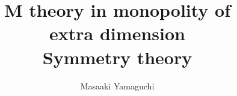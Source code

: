 \documentclass{jsarticle}
\begin{document}
\title{M theory in monopolity of \\
extra dimension\\
Symmetry theory}
\author{Masaaki Yamaguchi}
\date{}
\maketitle
   \newcommand{\variint}{%
	\begin{picture}(15,30)
		\put(0,0){
			$ \iint $}
		\put(0,5){\line(15,0){15}}
	\end{picture} %
}

\newcommand{\variiint}{%
	\begin{picture}(15,15)
		\put(0,0){
			$ \iiint $}
		\put(0,5){\line(15,0){20}}
	\end{picture} %
}



 \newcommand{\alearletter}{%
	 \begin{picture}(10,20)
		 \put(0,0){
			 $ \square $}
		 \put(0,0){\line(1,1){10}}
	 \end{picture} %
	 }

 \newcommand{\secproduct}{%
	 \begin{picture}(10,20)
		 \put(0,0){
			 $ \nabla $}
		 \put(5,0){+}
	 \end{picture} %
	 }
 \newcommand{\talot}{%
	 \begin{picture}(15,20)
		 \put(0,0){
			 $ \text{\scalebox{2.0}[2]{$\nabla$}}$}
		 \put(5,3){
			 $ \Delta $}
	 \end{picture} %
	 }
 \newcommand{\hazerdnabla}{%
	 \begin{picture}(15,20)
		 \put(0,0){
			 $ \text{\scalebox{2.0}[2]{$\nabla$}}$}
		 \put(5,3){
			 $\text{Y}  $}
	 \end{picture} %
	 }

 \newcommand{\securebox}{%
	 \begin{picture}(15,20)
		 \put(0,0){
			 $ \text{\scalebox{2.0}[2]{$\square$}}$}
		 \put(5,3){
			 $\text{Y}  $}
	 \end{picture} %
	 }


\newcommand{\timebow}{%
	\begin{picture}(5,5)
		\put(0,0){$\text{\rotatebox{90}{$\bowtie$}}$}
	\end{picture} %
	}


 \newcommand{\flowerletter}{%
	 \begin{picture}(10,20)
		 \put(0,0){$\text{\scalebox{1.0}[1]{$\square$}}$}
		 \put(0,0){$\text{\scalebox{1.0}[2]{$\int$}}$}
	 \end{picture} %
	 }
\newcommand{\squareiint}{%
	\begin{picture}(10,20)
		\put(0,0){
			$ \iint $}
		\put(0,4){$\text{\scalebox{3.0}[0.5]{$\square$}}$}
	\end{picture} %
}
\end{document}
